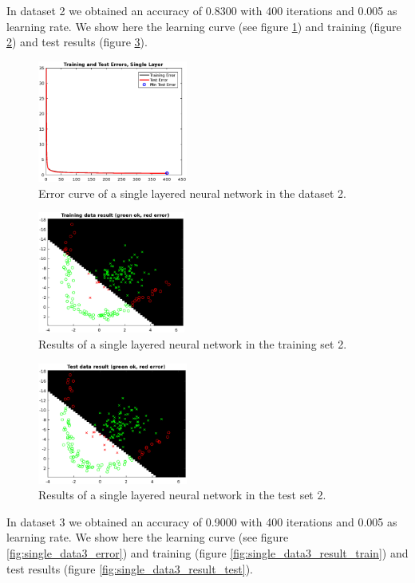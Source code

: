 \documentclass{article}
\begin{document}
In dataset 2 we obtained an accuracy of 0.8300 with 400 iterations and 0.005 as learning rate. We show here the learning curve (see figure \ref{fig:single_data2_error}) and training (figure \ref{fig:single_data2_result_train}) and test results (figure \ref{fig:single_data2_result_test}).

\begin{figure}[H]
\centering
\includegraphics[height=4cm]{images/single_data2_error}
\caption{Error curve of a single layered neural network in the dataset 2.}
\label{fig:single_data2_error}
\end{figure}

\begin{figure}[H]
\centering
\includegraphics[height=4cm]{images/single_data2_result_train}
\caption{Results of a single layered neural network in the training set 2.}
\label{fig:single_data2_result_train}
\end{figure}

\begin{figure}[H]
\centering
\includegraphics[height=4cm]{images/single_data2_result_test}
\caption{Results of a single layered neural network in the test set 2.}
\label{fig:single_data2_result_test}
\end{figure}


In dataset 3 we obtained an accuracy of 0.9000 with 400 iterations and 0.005 as learning rate. We show here the learning curve (see figure \ref{fig:single_data3_error}) and training (figure \ref{fig:single_data3_result_train}) and test results (figure \ref{fig:single_data3_result_test}).
\end{document}
